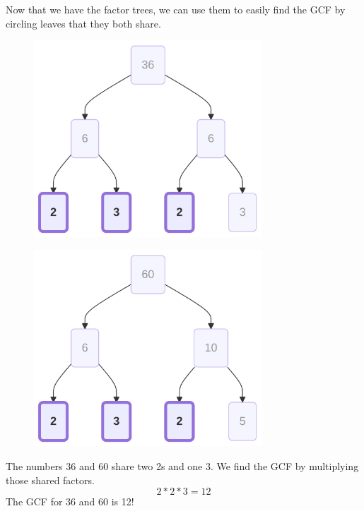 \documentclass[
  letterpaper,
  DIV=11,
  numbers=noendperiod]{scrreprt}
\begin{document}
Now that we have the factor trees, we can use them to easily find the
GCF by circling leaves that they both share.

\begin{figure}

\begin{minipage}{0.50\linewidth}

\label{mermaid-diagram}
\includegraphics[width=3.35in,height=2.9in]{chapters/Unit_1/1.3_GCF_&_Simplifying_Fractions_files/figure-latex/mermaid-figure-20.png}

\end{minipage}%
%
\begin{minipage}{0.50\linewidth}

\label{mermaid-diagram}
\includegraphics[width=3.35in,height=2.9in]{chapters/Unit_1/1.3_GCF_&_Simplifying_Fractions_files/figure-latex/mermaid-figure-19.png}

\end{minipage}%

\end{figure}%

The numbers 36 and 60 share two 2s and one 3. We find the GCF by
multiplying those shared factors. \[
2 * 2 * 3 = 12
\] The GCF for 36 and 60 is 12!
\end{document}
